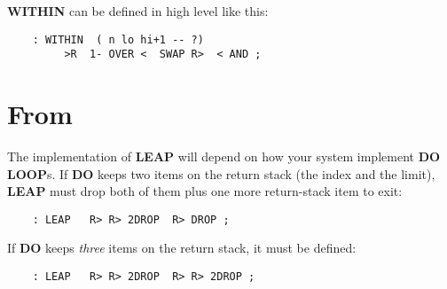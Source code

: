 {\bf WITHIN} can be defined in high level like this:
\begin{verbatim}
    : WITHIN  ( n lo hi+1 -- ?)
         >R  1- OVER <  SWAP R>  < AND ;
\end{verbatim}
\section{From }
The implementation of {\bf LEAP} will depend on how your system 
implement {\bf DO LOOP}s.  If {\bf DO} keeps two items on the return stack (the
index and the limit), {\bf LEAP} must drop both of them plus one more
return-stack item to exit:
\begin{verbatim}
    : LEAP   R> R> 2DROP  R> DROP ;
\end{verbatim}
If {\bf DO} keeps \emph{three} items on the return stack, it must be defined: 
\begin{verbatim}
    : LEAP   R> R> 2DROP  R> R> 2DROP ;
\end{verbatim}

